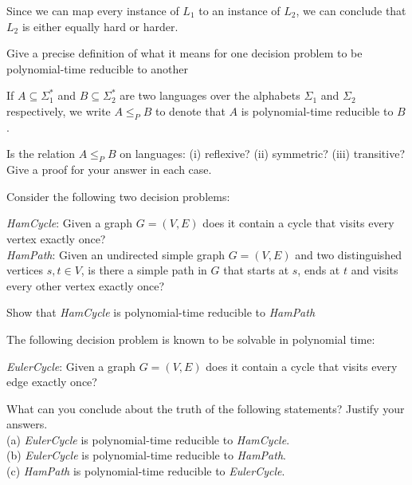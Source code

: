 Since we can map every instance of $L_1$ to an instance of $L_2$, 
we can conclude that $L_2$ is either equally hard or harder.



\frmrule

\begin{example}
Give a precise definition of what it means for one decision problem to be
polynomial-time reducible to another
\end{example}

\begin{example}
If  $A \subseteq \Sigma^{*}_1$ and $B \subseteq \Sigma^{*}_2$
are two languages over the alphabets $\Sigma_1$ and $\Sigma_2$ respectively,
we write $A \leq_P B$ to denote that $A$ is polynomial-time reducible to $B$.

Is the relation $A \leq_P B$ on languages:
(i) reflexive? (ii) symmetric? (iii) transitive?
Give a proof for your answer in each case.
\end{example}


\begin{example}
Consider the following two decision problems:

\textit{HamCycle}: Given a graph $G = (V,E)$ does it contain a cycle that visits
every vertex exactly once? \\
\textit{HamPath}: Given an undirected simple graph $G = (V,E)$ 
and two distinguished vertices $s, t \in V$, 
is there a simple path in $G$ that starts at $s$, ends at $t$ 
and visits every other vertex exactly once?

Show that \textit{HamCycle} is polynomial-time reducible to \textit{HamPath}
\end{example}

\begin{example}
The following decision problem is known to be solvable in polynomial time:

\textit{EulerCycle}: Given a graph $G = (V, E)$ does it contain a cycle that visits
every edge exactly once?

What can you conclude about the truth of the following statements? Justify
your answers.\\
(a) \textit{EulerCycle} is polynomial-time reducible to \textit{HamCycle}.\\
(b) \textit{EulerCycle} is polynomial-time reducible to \textit{HamPath}.\\
(c) \textit{HamPath} is polynomial-time reducible to \textit{EulerCycle}.
\end{example}


